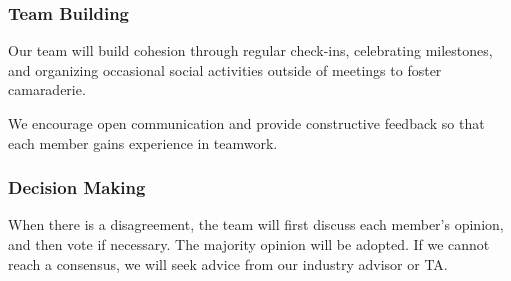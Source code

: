 \documentclass{article}
\begin{document}
\subsubsection*{Team Building}

Our team will build cohesion through regular check-ins, 
celebrating milestones, and organizing occasional social 
activities outside of meetings to foster camaraderie.

We encourage open communication and provide constructive feedback so that 
each member gains experience in teamwork.

\subsubsection*{Decision Making} 


When there is a disagreement, the team will first discuss each member's opinion, 
and then vote if necessary. The majority opinion will be adopted.
If we cannot reach a consensus, we will seek advice from our industry advisor or TA.
\end{document}
